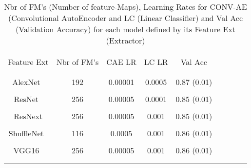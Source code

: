 \documentclass[conference]{IEEEtran}
\begin{document}
            \begin{table}[htbp]
            \centering
            \caption{Nbr of FM's (Number of feature-Maps), Learning Rates for CONV-AE (Convolutional AutoEncoder and LC (Linear Classifier) and Val Acc (Validation Accuracy) for each model defined by its Feature Ext (Extractor)}
            \begin{tabular}{c c c c c c c c c}
            \hline\\
            Feature Ext &   Nbr of FM's & CAE LR  & LC LR &   Val Acc  \\\\ 
            \hline\\
            AlexNet~\cite{alexnet}   & 192 &0.00001 & 0.0005 &  0.87 (0.01)  \\\\
            ResNet~\cite{resnet}    & 256 &0.00005 & 0.0001 &  0.85 (0.01)  \\\\
            ResNext\cite{resnext}     & 256 &0.00005 & 0.001  &  0.85 (0.01)  \\\\
            ShuffleNet~\cite{shufflenetv2}  & 116 &0.0005  & 0.001  &  0.86 (0.01)  \\\\
            VGG16~\cite{vgg16}     & 256 &0.00005 & 0.001  &  0.86 (0.01) \\\\
            \hline\\
            \end{tabular}
            \end{table}	
\end{document}
